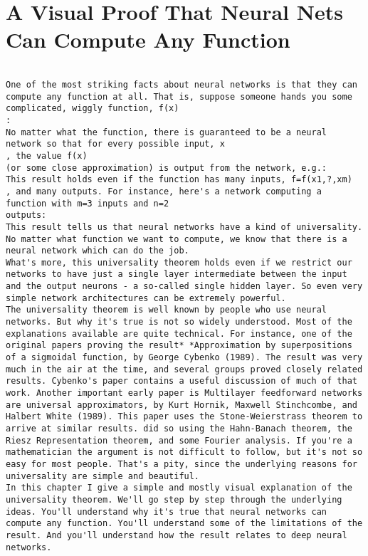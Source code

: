 
\chapter{A Visual Proof That Neural Nets Can Compute Any Function}
\label{sec:AVisualProofThatNeuralNetsCanComputeAnyFunction}


\begin{lstlisting}

One of the most striking facts about neural networks is that they can compute any function at all. That is, suppose someone hands you some complicated, wiggly function, f(x)
:
No matter what the function, there is guaranteed to be a neural network so that for every possible input, x
, the value f(x)
(or some close approximation) is output from the network, e.g.:
This result holds even if the function has many inputs, f=f(x1,?,xm)
, and many outputs. For instance, here's a network computing a function with m=3 inputs and n=2
outputs:
This result tells us that neural networks have a kind of universality. No matter what function we want to compute, we know that there is a neural network which can do the job.
What's more, this universality theorem holds even if we restrict our networks to have just a single layer intermediate between the input and the output neurons - a so-called single hidden layer. So even very simple network architectures can be extremely powerful.
The universality theorem is well known by people who use neural networks. But why it's true is not so widely understood. Most of the explanations available are quite technical. For instance, one of the original papers proving the result* *Approximation by superpositions of a sigmoidal function, by George Cybenko (1989). The result was very much in the air at the time, and several groups proved closely related results. Cybenko's paper contains a useful discussion of much of that work. Another important early paper is Multilayer feedforward networks are universal approximators, by Kurt Hornik, Maxwell Stinchcombe, and Halbert White (1989). This paper uses the Stone-Weierstrass theorem to arrive at similar results. did so using the Hahn-Banach theorem, the Riesz Representation theorem, and some Fourier analysis. If you're a mathematician the argument is not difficult to follow, but it's not so easy for most people. That's a pity, since the underlying reasons for universality are simple and beautiful.
In this chapter I give a simple and mostly visual explanation of the universality theorem. We'll go step by step through the underlying ideas. You'll understand why it's true that neural networks can compute any function. You'll understand some of the limitations of the result. And you'll understand how the result relates to deep neural networks.

\end{lstlisting}
